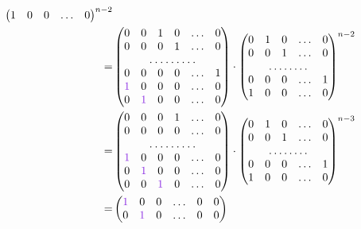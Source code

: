 \documentclass[a4paper,12pt]{article}
\begin{document}
\begin{solution}
\begin{equation*}
\begin{split}
\begin{pmatrix}
          1 & 0 & 0 & \ldots & 0
        \end{pmatrix}^{n-2}\\
      = &\begin{pmatrix}
          0 & 0 & 1 & 0 & \ldots & 0\\
          0 & 0 & 0 & 1 & \ldots & 0\\
          \hdotsfor{6}\\
          0 & 0 & 0 & 0 & \ldots & 1\\
          \textcolor{light-purple}{1} & 0 & 0 & 0 & \ldots & 0\\
          0 & \textcolor{light-purple}{1} & 0 & 0 & \ldots & 0
        \end{pmatrix}
        \cdot \begin{pmatrix}
          0 & 1 & 0 & \ldots & 0\\
          0 & 0 & 1 & \ldots & 0\\
          \hdotsfor{5}\\
          0 & 0 & 0 & \ldots & 1\\
          1 & 0 & 0 & \ldots & 0
        \end{pmatrix}^{n-2}\\
      = &\begin{pmatrix}
          0 & 0 & 0 & 1 & \ldots & 0\\
          0 & 0 & 0 & 0 & \ldots & 0\\
          \hdotsfor{6}\\
          \textcolor{light-purple}{1} & 0 & 0 & 0 & \ldots & 0\\
          0 & \textcolor{light-purple}{1} & 0 & 0 & \ldots & 0\\
          0 & 0 & \textcolor{light-purple}{1} & 0 & \ldots & 0
        \end{pmatrix}
        \cdot \begin{pmatrix}
          0 & 1 & 0 & \ldots & 0\\
          0 & 0 & 1 & \ldots & 0\\
          \hdotsfor{5}\\
          0 & 0 & 0 & \ldots & 1\\
          1 & 0 & 0 & \ldots & 0
        \end{pmatrix}^{n-3}\\
      = &\begin{pmatrix}
          \textcolor{light-purple}{1} & 0 & 0 & \ldots & 0 & 0\\
          0 & \textcolor{light-purple}{1} & 0 & \ldots & 0 & 0\\

\end{pmatrix}
\end{split}
\end{equation*}
\end{solution}
\end{document}
